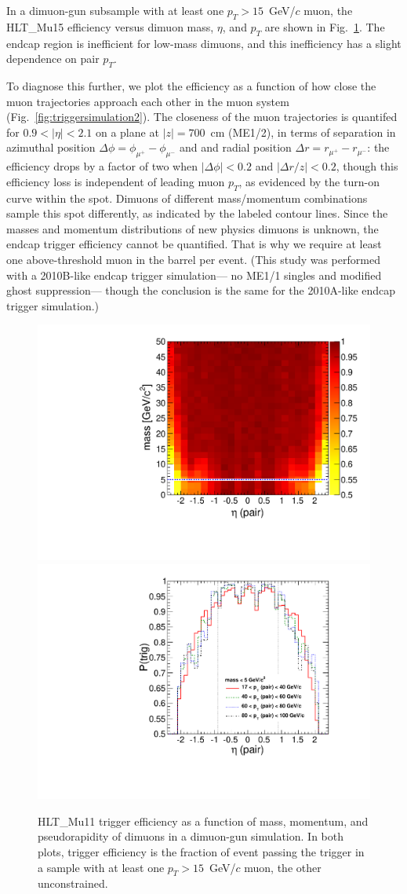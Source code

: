 \documentclass[12pt]{cms-tdr}
\begin{document}
In a dimuon-gun subsample with at least one $p_T > 15$~GeV/$c$ muon,
the HLT\_Mu15 efficiency versus dimuon mass, $\eta$, and $p_T$ are
shown in Fig.~\ref{fig:triggersimulation}.    The endcap region is inefficient for low-mass
dimuons, and this inefficiency has a slight dependence on pair $p_T$.

To diagnose this further, we plot the efficiency as a function of how
close the muon trajectories approach each other in the muon system
(Fig.~\ref{fig:triggersimulation2}).  The closeness of the muon
trajectories is quantifed for $0.9 < |\eta| < 2.1$ on a plane at $|z|
= 700$~cm (ME1/2), in terms of separation in azimuthal position
$\Delta \phi = \phi_{\mu^+} - \phi_{\mu^-}$ and and radial position
$\Delta r = r_{\mu^+} - r_{\mu^-}$: the efficiency drops
by a factor of two when $|\Delta \phi| < 0.2$ and $|\Delta r/z| <
0.2$, though this efficiency loss is independent of leading muon
$p_T$, as evidenced by the turn-on curve within the spot.  Dimuons of
different mass/momentum combinations sample this spot differently, as
indicated by the labeled contour lines.  Since the masses and momentum
distributions of new physics dimuons is unknown, the endcap trigger
efficiency cannot be quantified.  That is why we require at least one
above-threshold muon in the barrel per event.  (This study was
performed with a 2010B-like endcap trigger simulation--- no ME1/1
singles and modified ghost suppression--- though the conclusion is the
same for the 2010A-like endcap trigger simulation.)

\begin{figure}[p]
\includegraphics[width=0.48\linewidth]{PLOTS/masseta_pluscut_Mu11.pdf} \hfill
\includegraphics[width=0.48\linewidth]{PLOTS/eta_mass5cut_pluscut_Mu11_alt.pdf}

\caption{HLT\_Mu11 trigger efficiency as a function of mass, momentum,
  and pseudorapidity of dimuons in a dimuon-gun simulation.  In both
  plots, trigger efficiency is the fraction of event passing the
  trigger in a sample with at least one $p_T > 15$~GeV/$c$ muon, the
  other unconstrained.  \label{fig:triggersimulation}}
\end{figure}
\end{document}

